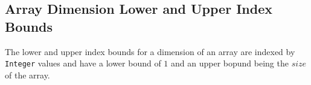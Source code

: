\documentclass[11pt,a4paper,notitlepage]{report}
\begin{document}
\subsection{Array Dimension Lower and Upper Index Bounds} \label{array:bounds}

The lower and upper index bounds for a dimension of an array are indexed by \verb"Integer" values and have a lower bound of $1$ and an upper bopund being the $size$ of the array.


%
\end{document}
